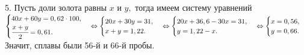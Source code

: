 5. Пусть доли золота равны $x$ и $y,$ тогда имеем систему уравнений $\begin{cases} 40x+60y=0,62\cdot100,\\ \cfrac{x+y}{2}=0,61.\end{cases}\Leftrightarrow
\begin{cases} 20x+30y=31,\\ x+y=1,22.\end{cases}\Leftrightarrow
\begin{cases} 20x+36,6-30x=31,\\ y=1,22-x.\end{cases}\Leftrightarrow
\begin{cases} x=0,56,\\ y=0,66.\end{cases}$
Значит, сплавы были 56-й и 66-й пробы.\\
